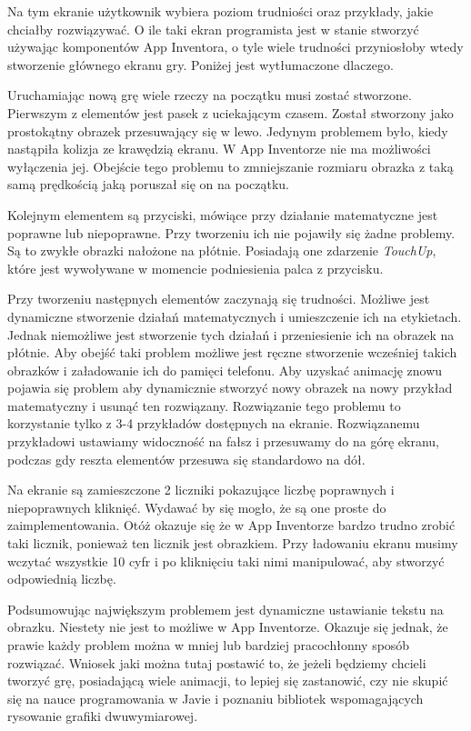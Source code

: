 Na tym ekranie użytkownik wybiera poziom trudniości oraz przykłady, jakie chciałby rozwiązywać. O ile taki ekran programista jest w stanie stworzyć używając komponentów App Inventora, o tyle wiele trudności przyniosłoby wtedy stworzenie głównego ekranu gry. Poniżej jest wytłumaczone dlaczego.

Uruchamiając nową grę wiele rzeczy na początku musi zostać stworzone. Pierwszym z elementów jest pasek z uciekającym czasem. Został stworzony jako prostokątny obrazek przesuwający się w lewo. Jedynym problemem było, kiedy nastąpiła kolizja ze krawędzią ekranu. W App Inventorze nie ma możliwości wyłączenia jej. Obejście tego problemu to zmniejszanie rozmiaru obrazka z taką samą prędkością jaką poruszał się on na początku.

Kolejnym elementem są przyciski, mówiące przy działanie matematyczne jest poprawne lub niepoprawne. Przy tworzeniu ich nie pojawiły się żadne problemy. Są to zwykłe obrazki nałożone na płótnie. Posiadają one zdarzenie \emph{TouchUp}, które jest wywoływane w momencie podniesienia palca z przycisku.

Przy tworzeniu następnych elementów zaczynają się trudności. Możliwe jest dynamiczne stworzenie działań matematycznych i umieszczenie ich na etykietach. Jednak niemożliwe jest stworzenie tych działań i przeniesienie ich na obrazek na płótnie. Aby obejść taki problem możliwe jest ręczne stworzenie wcześniej takich obrazków i załadowanie ich do pamięci telefonu. Aby uzyskać animację znowu pojawia się problem aby dynamicznie stworzyć nowy obrazek na nowy przykład matematyczny i usunąć ten rozwiązany. Rozwiązanie tego problemu to korzystanie tylko z 3-4 przykładów dostępnych na ekranie. Rozwiązanemu przykładowi ustawiamy widoczność na fałsz i przesuwamy do na górę ekranu, podczas gdy reszta elementów przesuwa się standardowo na dół.

Na ekranie są zamieszczone 2 liczniki pokazujące liczbę poprawnych i niepoprawnych kliknięć. Wydawać by się mogło, że są one proste do zaimplementowania. Otóż okazuje się że w App Inventorze bardzo trudno zrobić taki licznik, ponieważ ten licznik jest obrazkiem. Przy ładowaniu ekranu musimy wczytać wszystkie 10 cyfr i po kliknięciu taki nimi manipulować, aby stworzyć odpowiednią liczbę.

Podsumowując największym problemem jest dynamiczne ustawianie tekstu na obrazku. Niestety nie jest to możliwe w App Inventorze. Okazuje się jednak, że prawie każdy problem można w mniej lub bardziej pracochłonny sposób rozwiązać. Wniosek jaki można tutaj postawić to, że jeżeli będziemy chcieli tworzyć grę, posiadającą wiele animacji, to lepiej się zastanowić, czy nie skupić się na nauce programowania w Javie i poznaniu bibliotek wspomagających rysowanie grafiki dwuwymiarowej.







